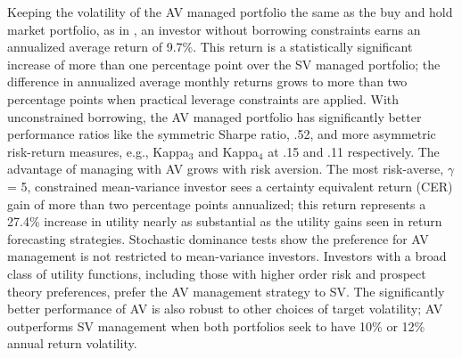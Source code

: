 Keeping the volatility of the AV managed portfolio the same as the buy and hold market portfolio, as in \citet{moreira_volatility-managed_2017}, an investor without borrowing constraints earns an annualized average return of 9.7\%. This return is a statistically significant increase of more than one percentage point over the SV managed portfolio; the difference in annualized average monthly returns grows to more than two percentage points when practical leverage constraints are applied. With unconstrained borrowing, the AV managed portfolio has significantly better performance ratios like the symmetric Sharpe ratio, .52, and more asymmetric risk-return measures, e.g., Kappa$_{3}$ and Kappa$_{4}$ at .15 and .11 respectively. The advantage of managing with AV grows with risk aversion. The most risk-averse, $\gamma$ = 5, constrained mean-variance investor sees a certainty equivalent return (CER) gain of more than two percentage points annualized; this return represents a 27.4\% increase in utility nearly as substantial as the utility gains seen in return forecasting strategies. \citep{campbell1997econometrics} Stochastic dominance tests show the preference for AV management is not restricted to mean-variance investors. Investors with a broad class of utility functions, including those with higher order risk and prospect theory preferences, prefer the AV management strategy to SV. 
The significantly better performance of AV is also robust to other choices of target volatility; AV outperforms SV management when both portfolios seek to have 10\% or 12\% annual return volatility. 

